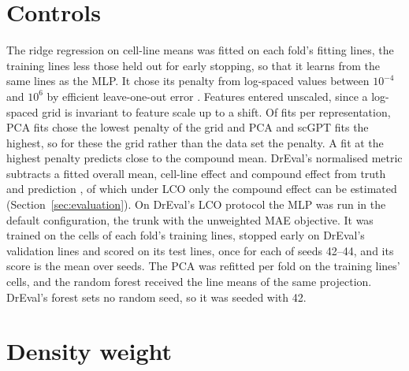 \section{Controls}
\label{app:controls}

The ridge regression on cell-line means was fitted on each fold's fitting lines, the training lines
less those held out for early stopping, so that it learns from the same lines as the MLP. It chose its
penalty from \CfgGridN{} log-spaced values between $10^{-4}$ and $10^{6}$ by efficient leave-one-out
error \cite{hastie2009,pedregosa2011}. Features entered unscaled, since a log-spaced grid is invariant
to feature scale up to a shift. Of \RidgeFitsPerRep{} fits per representation, \RidgeFloorPca{} PCA fits
chose the lowest penalty of the grid and \RidgeCeilPca{} PCA and \RidgeCeilScgpt{} scGPT fits the highest, so
for these the grid rather than the data set the penalty. A fit at the highest penalty predicts close to
the compound mean.
DrEval's normalised metric subtracts a fitted overall mean, cell-line effect and compound effect from
truth and prediction \cite{dreval}, of which under LCO only the compound effect can be estimated
(Section~\ref{sec:evaluation}).
On DrEval's LCO protocol the MLP was run in the default configuration, the trunk with the unweighted
MAE objective. It was trained on the cells of each fold's training lines, stopped early on DrEval's
validation lines and scored on its test lines, once for each of seeds 42--44, and its score is the mean
over seeds. The PCA was refitted per fold on the training lines' cells, and the random forest received
the line means of the same projection. DrEval's forest sets no random seed, so it was seeded with 42.

\section{Density weight}
\label{app:density}

